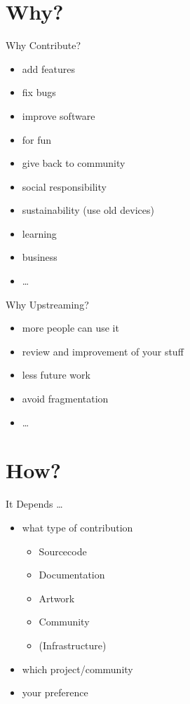 \documentclass{beamer}
\begin{document}
\section{Why?}

\frame{\tableofcontents[currentsection]}

\begin{frame}{Why Contribute?}
    \begin{itemize}
        \item add features
        \item fix bugs
        \item improve software
        \item for fun
        \item give back to community
        \item social responsibility
        \item sustainability (use old devices)
        \item learning
        \item business
        \item \dots
    \end{itemize}
\end{frame}

\begin{frame}{Why Upstreaming?}
    \begin{itemize}
        \item more people can use it
        \item review and improvement of your stuff
        \item less future work
        \item avoid fragmentation
        \item \dots
    \end{itemize}
\end{frame}


\section{How?}

\frame{\tableofcontents[currentsection]}

\begin{frame}{It Depends \dots}
    \begin{itemize}
        \item what type of contribution
            \begin{itemize}
                \item Sourcecode
                \item Documentation
                \item Artwork
                \item Community
                \item (Infrastructure)
            \end{itemize}
        \item which project/community
        \item your preference
    \end{itemize}
\end{frame}
\end{document}
